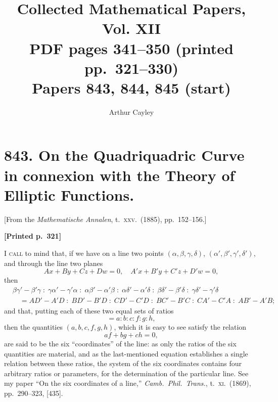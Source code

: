 \documentclass[11pt]{article}
\title{Collected Mathematical Papers, Vol. XII\\ \large PDF pages 341--350 (printed pp.\ 321--330)\\ Papers 843, 844, 845 (start)}
\author{Arthur Cayley}
\date{}
\begin{document}
\maketitle


\section*{843. On the Quadriquadric Curve in connexion with the Theory of Elliptic Functions.}

\begin{center}
\small [From the \textit{Mathematische Annalen}, t.\ \textsc{xxv}.\ (1885), pp.\ 152--156.]
\end{center}

\medskip

\noindent\textbf{[Printed p.~321]}\hfill

I \textsc{call} to mind that, if we have on a line two points $(\alpha, \beta, \gamma, \delta)$, $(\alpha', \beta', \gamma', \delta')$, and through the line two planes
\[
Ax + By + Cz + Dw = 0, \quad A'x + B'y + C'z + D'w = 0,
\]
then
\begin{align*}
&\beta\gamma' - \beta'\gamma \;:\; \gamma\alpha' - \gamma'\alpha \;:\; \alpha\beta' - \alpha'\beta \;:\; \alpha\delta' - \alpha'\delta \;:\; \beta\delta' - \beta'\delta \;:\; \gamma\delta' - \gamma'\delta \\
&\quad = AD' - A'D \;:\; BD' - B'D \;:\; CD' - C'D \;:\; BC' - B'C \;:\; CA' - C'A \;:\; AB' - A'B;
\end{align*}
and that, putting each of these two equal sets of ratios
\[
= a : b : c : f : g : h,
\]
then the quantities $(a, b, c, f, g, h)$, which it is easy to see satisfy the relation
\[
af + bg + ch = 0,
\]
are said to be the six ``coordinates'' of the line: as only the ratios of the six quantities are material, and as the last-mentioned equation establishes a single relation between these ratios, the system of the six coordinates contains four arbitrary ratios or parameters, for the determination of the particular line. See my paper ``On the six coordinates of a line,'' \textit{Camb.\ Phil.\ Trans.}, t.\ \textsc{xi}.\ (1869), pp.\ 290--323, [435].

\medskip
\end{document}
